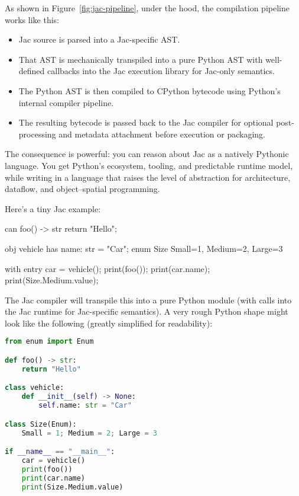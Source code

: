 As shown in Figure~\ref{fig:jac-pipeline}, under the hood, the compilation pipeline works like this:

\begin{itemize}
    \item Jac source is parsed into a Jac-specific AST.
    \item That AST is mechanically transpiled into a pure Python AST with well-defined callbacks into the Jac execution library for Jac-only semantics.
    \item The Python AST is then compiled to CPython bytecode using Python's internal compiler pipeline.
    \item The resulting bytecode is passed back to the Jac compiler for optional post-processing and metadata attachment before execution or packaging.
\end{itemize}



The consequence is powerful: you can reason about Jac as a natively Pythonic language. You get Python's ecosystem, tooling, and predictable runtime model, while writing in a language that raises the level of abstraction for architecture, dataflow, and object–spatial programming.

Here's a tiny Jac example:

\begin{jacblock}
can foo() -> str {
    return "Hello";
}

obj vehicle {
    has name: str = "Car";
}
enum Size {
    Small=1, Medium=2, Large=3
}

with entry {
    car = vehicle();
    print(foo());
    print(car.name);
    print(Size.Medium.value);
}
\end{jacblock}

The Jac compiler will transpile this into a pure Python module (with calls into the Jac runtime for Jac-specific semantics). A very rough Python shape might look like the following (greatly simplified for readability):

\begin{lstlisting}[language=Python]
from enum import Enum

def foo() -> str:
    return "Hello"

class vehicle:
    def __init__(self) -> None:
        self.name: str = "Car"

class Size(Enum):
    Small = 1; Medium = 2; Large = 3

if __name__ == "__main__":
    car = vehicle()
    print(foo())
    print(car.name)
    print(Size.Medium.value)
\end{lstlisting}

